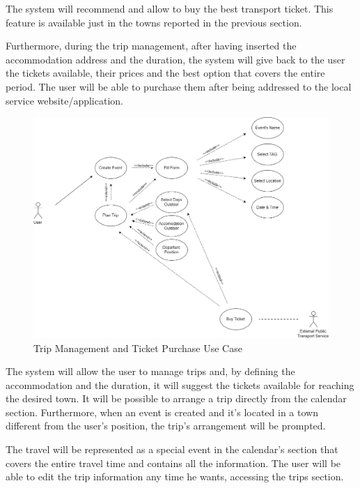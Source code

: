 The system will recommend and allow to buy the best transport ticket. This feature is available just in the towns reported in the previous section.\par
Furthermore, during the trip management, after having inserted the accommodation address and the duration, the system will give back to the user the tickets available, their prices and the best option that covers the entire period. The user will be able to purchase them after being addressed to the local service website/application. 

\begin{figure}[H]
	\centering
	\includegraphics[scale=0.25]{Images/Use_Case/Trip}
	\caption{Trip Management and Ticket Purchase Use Case}
\end{figure}
The system will allow the user to manage trips and, by defining the accommodation and the duration, it will suggest the tickets available for reaching the desired town. It will be possible to arrange a trip directly from the calendar section. Furthermore, when an event is created and it’s located in a town different from the user’s position, the trip’s arrangement will be prompted.\par
The travel will be represented as a special event in the calendar’s section that covers the entire travel time and contains all the information.
The user will be able to edit the trip information any time he wants, accessing the trips section.

